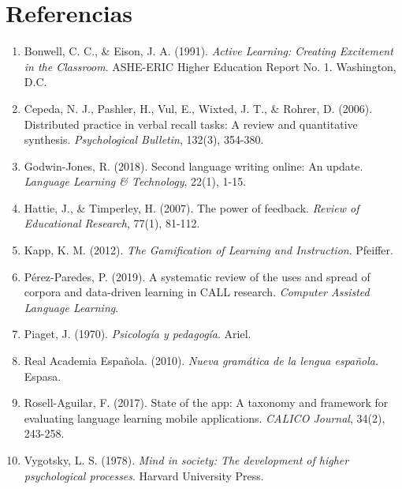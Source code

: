 \documentclass[12pt,spanish]{article}
\begin{document}
\section{Referencias}

\begin{enumerate}
    \item Bonwell, C. C., \& Eison, J. A. (1991). \textit{Active Learning: Creating Excitement in the Classroom}. ASHE-ERIC Higher Education Report No. 1. Washington, D.C.

    \item Cepeda, N. J., Pashler, H., Vul, E., Wixted, J. T., \& Rohrer, D. (2006). Distributed practice in verbal recall tasks: A review and quantitative synthesis. \textit{Psychological Bulletin}, 132(3), 354-380.

    \item Godwin-Jones, R. (2018). Second language writing online: An update. \textit{Language Learning \& Technology}, 22(1), 1-15.

    \item Hattie, J., \& Timperley, H. (2007). The power of feedback. \textit{Review of Educational Research}, 77(1), 81-112.

    \item Kapp, K. M. (2012). \textit{The Gamification of Learning and Instruction}. Pfeiffer.

    \item Pérez-Paredes, P. (2019). A systematic review of the uses and spread of corpora and data-driven learning in CALL research. \textit{Computer Assisted Language Learning}.

    \item Piaget, J. (1970). \textit{Psicología y pedagogía}. Ariel.

    \item Real Academia Española. (2010). \textit{Nueva gramática de la lengua española}. Espasa.

    \item Rosell-Aguilar, F. (2017). State of the app: A taxonomy and framework for evaluating language learning mobile applications. \textit{CALICO Journal}, 34(2), 243-258.

    \item Vygotsky, L. S. (1978). \textit{Mind in society: The development of higher psychological processes}. Harvard University Press.
\end{enumerate}
\end{document}
